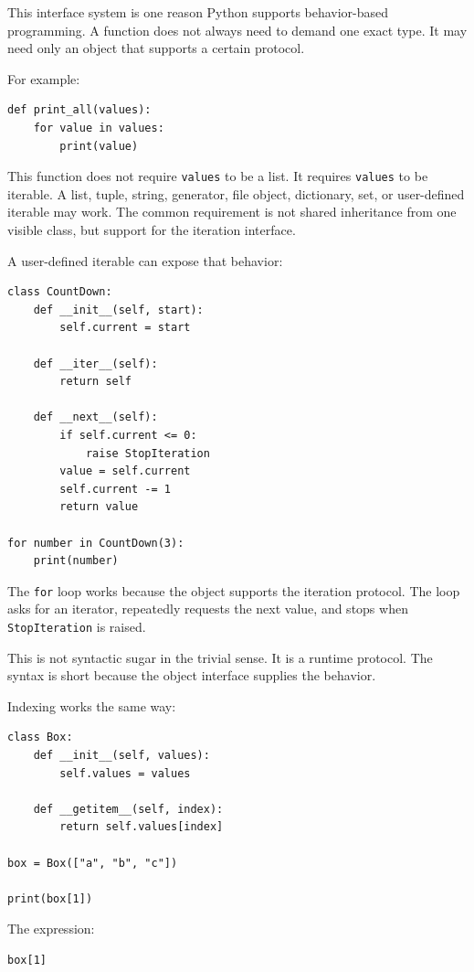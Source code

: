 This interface system is one reason Python supports behavior-based programming. A function does not always need to demand one exact type. It may need only an object that supports a certain protocol.

For example:

\begin{verbatim}
def print_all(values):
    for value in values:
        print(value)
\end{verbatim}

This function does not require \texttt{values} to be a list. It requires \texttt{values} to be iterable. A list, tuple, string, generator, file object, dictionary, set, or user-defined iterable may work. The common requirement is not shared inheritance from one visible class, but support for the iteration interface.

A user-defined iterable can expose that behavior:

\begin{verbatim}
class CountDown:
    def __init__(self, start):
        self.current = start

    def __iter__(self):
        return self

    def __next__(self):
        if self.current <= 0:
            raise StopIteration
        value = self.current
        self.current -= 1
        return value

for number in CountDown(3):
    print(number)
\end{verbatim}

The \texttt{for} loop works because the object supports the iteration protocol. The loop asks for an iterator, repeatedly requests the next value, and stops when \texttt{StopIteration} is raised.

This is not syntactic sugar in the trivial sense. It is a runtime protocol. The syntax is short because the object interface supplies the behavior.

Indexing works the same way:

\begin{verbatim}
class Box:
    def __init__(self, values):
        self.values = values

    def __getitem__(self, index):
        return self.values[index]

box = Box(["a", "b", "c"])

print(box[1])
\end{verbatim}

The expression:

\begin{verbatim}
box[1]
\end{verbatim}

